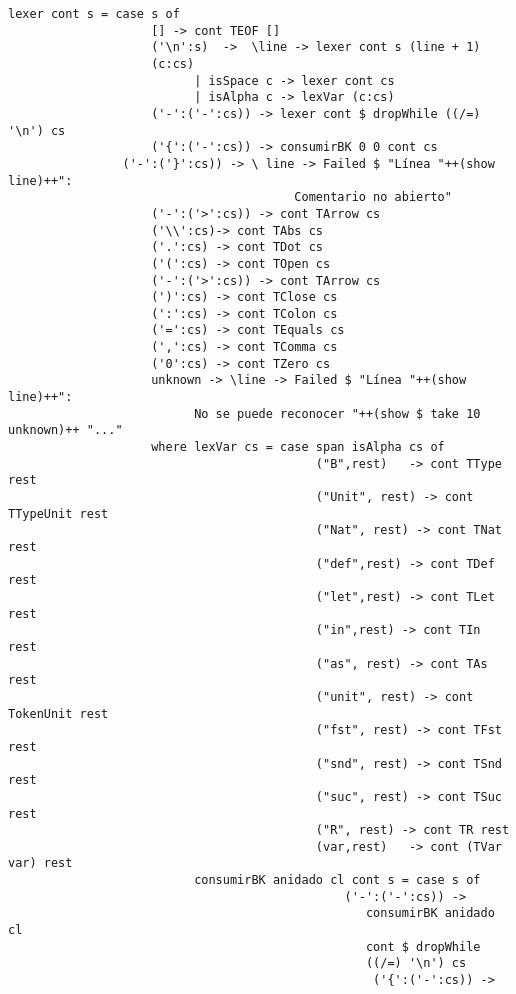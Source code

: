\documentclass[12pt, a4paper]{article}
\begin{document}
\begin{Verbatim}
lexer cont s = case s of
                    [] -> cont TEOF []
                    ('\n':s)  ->  \line -> lexer cont s (line + 1)
                    (c:cs)
                          | isSpace c -> lexer cont cs
                          | isAlpha c -> lexVar (c:cs)
                    ('-':('-':cs)) -> lexer cont $ dropWhile ((/=) '\n') cs
                    ('{':('-':cs)) -> consumirBK 0 0 cont cs	
	            ('-':('}':cs)) -> \ line -> Failed $ "Línea "++(show line)++":
	            				        Comentario no abierto"
                    ('-':('>':cs)) -> cont TArrow cs
                    ('\\':cs)-> cont TAbs cs
                    ('.':cs) -> cont TDot cs
                    ('(':cs) -> cont TOpen cs
                    ('-':('>':cs)) -> cont TArrow cs
                    (')':cs) -> cont TClose cs
                    (':':cs) -> cont TColon cs
                    ('=':cs) -> cont TEquals cs
                    (',':cs) -> cont TComma cs
                    ('0':cs) -> cont TZero cs
                    unknown -> \line -> Failed $ "Línea "++(show line)++":
                          No se puede reconocer "++(show $ take 10 unknown)++ "..."
                    where lexVar cs = case span isAlpha cs of
                                           ("B",rest)   -> cont TType rest
                                           ("Unit", rest) -> cont TTypeUnit rest
                                           ("Nat", rest) -> cont TNat rest
                                           ("def",rest) -> cont TDef rest
                                           ("let",rest) -> cont TLet rest
                                           ("in",rest) -> cont TIn rest
                                           ("as", rest) -> cont TAs rest
                                           ("unit", rest) -> cont TokenUnit rest
                                           ("fst", rest) -> cont TFst rest
                                           ("snd", rest) -> cont TSnd rest
                                           ("suc", rest) -> cont TSuc rest
                                           ("R", rest) -> cont TR rest
                                           (var,rest)   -> cont (TVar var) rest
                          consumirBK anidado cl cont s = case s of
                                       		   ('-':('-':cs)) ->
                                       		      consumirBK anidado cl
                                       		      cont $ dropWhile
                                       		      ((/=) '\n') cs
		                                           ('{':('-':cs)) ->

\end{Verbatim}
\end{document}
